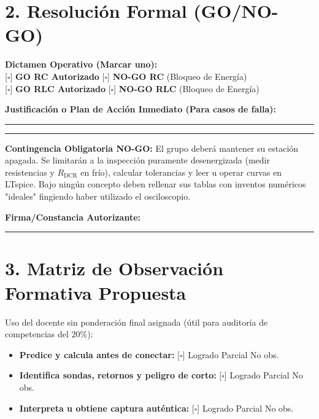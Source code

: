 \documentclass[11pt, a4paper]{article}
\begin{document}
\section*{2. Resolución Formal (GO/NO-GO)}
\begin{tcolorbox}[colback=gray!5, colframe=black, title=\textbf{Toma de Decisión Documentada}]
\textbf{Dictamen Operativo (Marcar uno):} \\
{[$\square$]} \textbf{GO RC Autorizado} \hspace{1cm} {[$\square$]} \textbf{NO-GO RC} (Bloqueo de Energía) \\
{[$\square$]} \textbf{GO RLC Autorizado} \hspace{0.8cm} {[$\square$]} \textbf{NO-GO RLC} (Bloqueo de Energía)

\vspace{0.4cm}
\textbf{Justificación o Plan de Acción Inmediato (Para casos de falla):} \par\vspace{0.2cm}
\rule{\textwidth}{0.4pt} \par\vspace{0.4cm}
\rule{\textwidth}{0.4pt} \par\vspace{0.4cm}

\textbf{Contingencia Obligatoria NO-GO:} El grupo deberá mantener su estación apagada. Se limitarán a la inspección puramente desenergizada (medir resistencias y $R_{\text{DCR}}$ en frío), calcular tolerancias y leer u operar curvas en LTspice. Bajo ningún concepto deben rellenar sus tablas con inventos numéricos "ideales" fingiendo haber utilizado el osciloscopio. \par\vspace{0.3cm}

\textbf{Firma/Constancia Autorizante:} \rule{6cm}{0.4pt}
\end{tcolorbox}

\section*{3. Matriz de Observación Formativa Propuesta}
Uso del docente sin ponderación final asignada (útil para auditoría de competencias del $20\%$):\par\vspace{0.2cm}
\begin{itemize}
    \item \textbf{Predice y calcula antes de conectar:} [$\square$] Logrado \quad [$\square$] Parcial \quad [$\square$] No obs.
    \item \textbf{Identifica sondas, retornos y peligro de corto:} [$\square$] Logrado \quad [$\square$] Parcial \quad [$\square$] No obs.
    \item \textbf{Interpreta u obtiene captura auténtica:} [$\square$] Logrado \quad [$\square$] Parcial \quad [$\square$] No obs.
\end{itemize}
\end{document}
